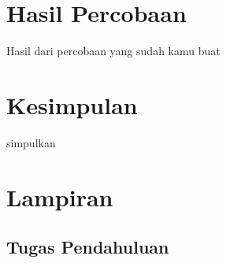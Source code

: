 \section{Hasil Percobaan}
Hasil dari percobaan yang sudah kamu buat

\section{Kesimpulan}
simpulkan

\section{Lampiran}

\subsection{Tugas Pendahuluan}

